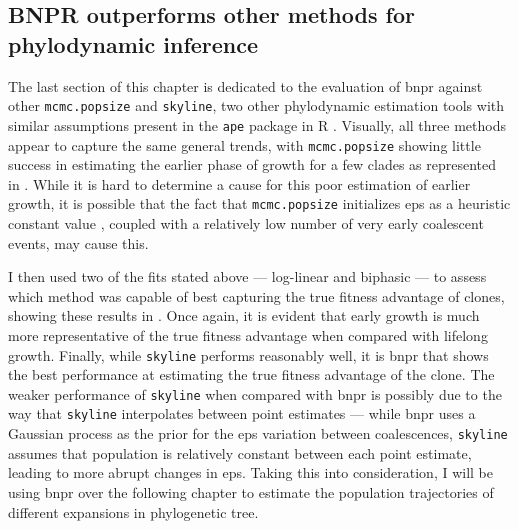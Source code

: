 \subsection{BNPR outperforms other methods for phylodynamic inference}

The last section of this chapter is dedicated to the evaluation of \ac{bnpr} against other \texttt{mcmc.popsize} and \texttt{skyline}, two other phylodynamic estimation tools with similar assumptions present in the \texttt{ape} package in R \cite{Paradis2019-na}. Visually, all three methods appear to capture the same general trends, with \texttt{mcmc.popsize} showing little success in estimating the earlier phase of growth for a few clades as represented in . While it is hard to determine a cause for this poor estimation of earlier growth, it is possible that the fact that \texttt{mcmc.popsize} initializes \ac{eps} as a heuristic constant value \cite{Opgen-Rhein2005-pi}, coupled with a relatively low number of very early coalescent events, may cause this.

\begin{figure}[!ht]
	\label{fig:compare-phylo-traj}
\end{figure}

I then used two of the fits stated above --- log-linear and biphasic --- to assess which method was capable of best capturing the true fitness advantage of clones, showing these results in . Once again, it is evident that early growth is much more representative of the true fitness advantage when compared with lifelong growth. Finally, while \texttt{skyline} performs reasonably well, it is \ac{bnpr} that shows the best performance at estimating the true fitness advantage of the clone. The weaker performance of \texttt{skyline} when compared with \ac{bnpr} is possibly due to the way that \texttt{skyline} interpolates between point estimates --- while \ac{bnpr} uses a Gaussian process as the prior for the \ac{eps} variation between coalescences, \texttt{skyline} assumes that population is relatively constant between each point estimate, leading to more abrupt changes in \ac{eps}. Taking this into consideration, I will be using \ac{bnpr} over the following chapter to estimate the population trajectories of different expansions in phylogenetic tree.

